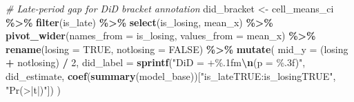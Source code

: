 \documentclass[
]{article}
\newenvironment{Shaded}{\begin{snugshade}}{\end{snugshade}}
\newcommand{\AttributeTok}[1]{\textcolor[rgb]{0.13,0.29,0.53}{#1}}
\newcommand{\CommentTok}[1]{\textcolor[rgb]{0.56,0.35,0.01}{\textit{#1}}}
\newcommand{\DecValTok}[1]{\textcolor[rgb]{0.00,0.00,0.81}{#1}}
\newcommand{\FunctionTok}[1]{\textcolor[rgb]{0.13,0.29,0.53}{\textbf{#1}}}
\newcommand{\NormalTok}[1]{#1}
\newcommand{\OtherTok}[1]{\textcolor[rgb]{0.56,0.35,0.01}{#1}}
\newcommand{\SpecialCharTok}[1]{\textcolor[rgb]{0.81,0.36,0.00}{\textbf{#1}}}
\newcommand{\StringTok}[1]{\textcolor[rgb]{0.31,0.60,0.02}{#1}}
\begin{document}
\begin{Shaded}
\begin{Highlighting}[]
\CommentTok{\# Late{-}period gap for DiD bracket annotation}
\NormalTok{did\_bracket }\OtherTok{\textless{}{-}}\NormalTok{ cell\_means\_ci }\SpecialCharTok{\%\textgreater{}\%}
  \FunctionTok{filter}\NormalTok{(is\_late) }\SpecialCharTok{\%\textgreater{}\%}
  \FunctionTok{select}\NormalTok{(is\_losing, mean\_x) }\SpecialCharTok{\%\textgreater{}\%}
  \FunctionTok{pivot\_wider}\NormalTok{(}\AttributeTok{names\_from =}\NormalTok{ is\_losing, }\AttributeTok{values\_from =}\NormalTok{ mean\_x) }\SpecialCharTok{\%\textgreater{}\%}
  \FunctionTok{rename}\NormalTok{(}\AttributeTok{losing =} \StringTok{\textasciigrave{}}\AttributeTok{TRUE}\StringTok{\textasciigrave{}}\NormalTok{, }\AttributeTok{notlosing =} \StringTok{\textasciigrave{}}\AttributeTok{FALSE}\StringTok{\textasciigrave{}}\NormalTok{) }\SpecialCharTok{\%\textgreater{}\%}
  \FunctionTok{mutate}\NormalTok{(}
    \AttributeTok{mid\_y     =}\NormalTok{ (losing }\SpecialCharTok{+}\NormalTok{ notlosing) }\SpecialCharTok{/} \DecValTok{2}\NormalTok{,}
    \AttributeTok{did\_label =} \FunctionTok{sprintf}\NormalTok{(}\StringTok{"DiD = +\%.1fm}\SpecialCharTok{\textbackslash{}n}\StringTok{(p = \%.3f)"}\NormalTok{,}
\NormalTok{                        did\_estimate,}
                        \FunctionTok{coef}\NormalTok{(}\FunctionTok{summary}\NormalTok{(model\_base))[}\StringTok{"is\_lateTRUE:is\_losingTRUE"}\NormalTok{, }\StringTok{"Pr(\textgreater{}|t|)"}\NormalTok{])}
\NormalTok{  )}


\end{Highlighting}
\end{Shaded}
\end{document}
